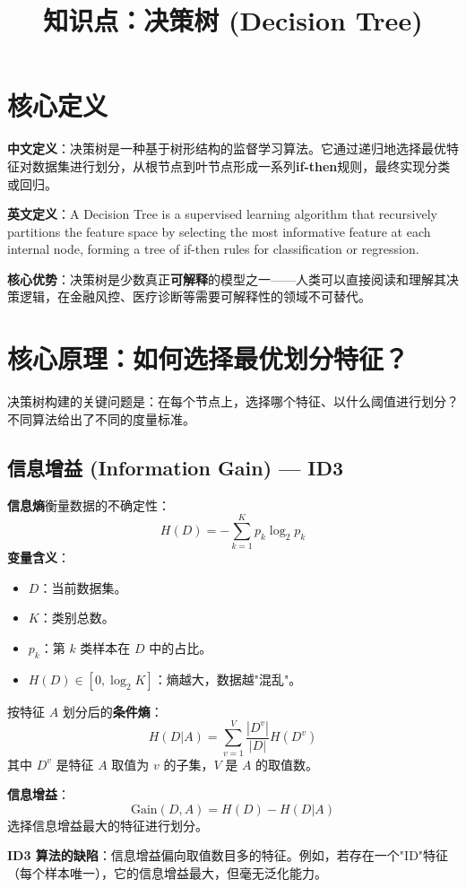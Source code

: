 \documentclass[12pt, a4paper]{article}
\title{知识点：决策树 (Decision Tree)}
\author{}
\date{}
\begin{document}
\maketitle

\section{核心定义}
\textbf{中文定义}：决策树是一种基于树形结构的监督学习算法。它通过递归地选择最优特征对数据集进行划分，从根节点到叶节点形成一系列\textbf{if-then}规则，最终实现分类或回归。

\textbf{英文定义}：A Decision Tree is a supervised learning algorithm that recursively partitions the feature space by selecting the most informative feature at each internal node, forming a tree of if-then rules for classification or regression.

\textbf{核心优势}：决策树是少数真正\textbf{可解释}的模型之一——人类可以直接阅读和理解其决策逻辑，在金融风控、医疗诊断等需要可解释性的领域不可替代。

\section{核心原理：如何选择最优划分特征？}
决策树构建的关键问题是：在每个节点上，选择哪个特征、以什么阈值进行划分？不同算法给出了不同的度量标准。

\subsection{信息增益 (Information Gain) — ID3}
\textbf{信息熵}衡量数据的不确定性：
$$ H(D) = -\sum_{k=1}^K p_k \log_2 p_k $$
\textbf{变量含义}：
\begin{itemize}
    \item $D$：当前数据集。
    \item $K$：类别总数。
    \item $p_k$：第 $k$ 类样本在 $D$ 中的占比。
    \item $H(D) \in [0, \log_2 K]$：熵越大，数据越"混乱"。
\end{itemize}
按特征 $A$ 划分后的\textbf{条件熵}：
$$ H(D|A) = \sum_{v=1}^V \frac{|D^v|}{|D|} H(D^v) $$
其中 $D^v$ 是特征 $A$ 取值为 $v$ 的子集，$V$ 是 $A$ 的取值数。

\textbf{信息增益}：
$$ \text{Gain}(D, A) = H(D) - H(D|A) $$
选择信息增益最大的特征进行划分。

\textbf{ID3 算法的缺陷}：信息增益偏向取值数目多的特征。例如，若存在一个"ID"特征（每个样本唯一），它的信息增益最大，但毫无泛化能力。
\end{document}
